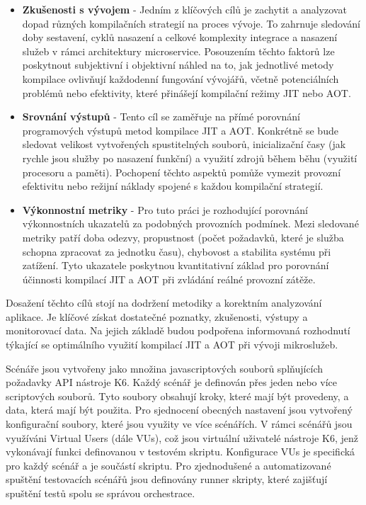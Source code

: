 \begin{itemize}
  \item \textbf{Zkušenosti s vývojem} - Jedním z klíčových cílů je zachytit a analyzovat dopad různých kompilačních strategií na proces vývoje. To zahrnuje sledování doby sestavení, cyklů nasazení a celkové komplexity integrace a nasazení služeb v rámci architektury microservice. Posouzením těchto faktorů lze poskytnout subjektivní i objektivní náhled na to, jak jednotlivé metody kompilace ovlivňují každodenní fungování vývojářů, včetně potenciálních problémů nebo efektivity, které přinášejí kompilační režimy JIT nebo AOT.
  \item \textbf{Srovnání výstupů} - Tento cíl se zaměřuje na přímé porovnání programových výstupů metod kompilace JIT a AOT. Konkrétně se bude sledovat velikost vytvořených spustitelných souborů, inicializační časy (jak rychle jsou služby po nasazení funkční) a využití zdrojů během běhu (využití procesoru a paměti). Pochopení těchto aspektů pomůže vymezit provozní efektivitu nebo režijní náklady spojené s každou kompilační strategií.
  \item \textbf{Výkonnostní metriky} - Pro tuto práci je rozhodující porovnání výkonnostních ukazatelů za podobných provozních podmínek. Mezi sledované metriky patří doba odezvy, propustnost (počet požadavků, které je služba schopna zpracovat za jednotku času), chybovost a stabilita systému při zatížení. Tyto ukazatele poskytnou kvantitativní základ pro porovnání účinnosti kompilací JIT a AOT při zvládání reálné provozní zátěže.
\end{itemize}

Dosažení těchto cílů stojí na dodržení metodiky a korektním analyzování aplikace. Je klíčové získat dostatečné poznatky, zkušenosti, výstupy a monitorovací data. Na jejich základě budou podpořena informovaná rozhodnutí týkající se optimálního využití kompilací JIT a AOT při vývoji mikroslužeb.


Scénáře jsou vytvořeny jako množina javascriptových souborů splňujících požadavky API nástroje K6. Každý scénář je definován přes jeden nebo více scriptových souborů. Tyto soubory obsahují kroky, které mají být provedeny, a data, která mají být použita. Pro sjednocení obecných nastavení jsou vytvořený konfigurační soubory, které jsou využity ve více scénářích. V rámci scénářů jsou využíváni Virtual Users (dále VUs), což jsou virtuální uživatelé nástroje K6, jenž vykonávají funkci definovanou v testovém skriptu. Konfigurace VUs je specifická pro každý scénář a je součástí skriptu. Pro zjednodušené a automatizované spuštění testovacích scénářů jsou definovány runner skripty, které zajišťují spuštění testů spolu se správou orchestrace.


